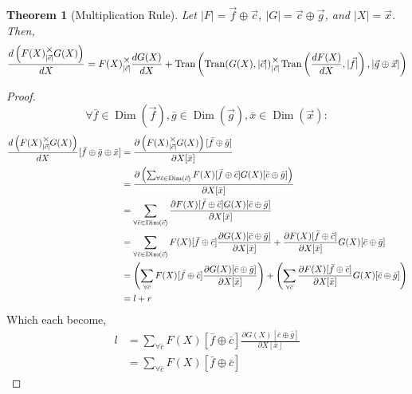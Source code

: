 \documentclass[12pt]{article}
\theoremstyle{definition}
\theoremstyle{plain}
\newtheorem{theorem}{Theorem}[section]
\theoremstyle{ppart}
\DeclareMathOperator{\Dim}{Dim}
\DeclareMathOperator{\Tran}{Tran}
\newcommand{\mmult}[1]{\text{\raisebox{1ex}{$\underset{#1}{\times}$}}}
\begin{document}
\begin{landscape}
\begin{theorem}[Multiplication Rule]
Let $|F| = \vec{f} \oplus \vec{c}$, $|G| = \vec{c} \oplus \vec{g}$,
and $|X| = \vec{x}$. Then,
\begin{align*}
 \frac{d\left(F(X) \mmult{|\vec{c}|} G(X)\right)}{dX} =
 F(X) \mmult{|\vec{c}|} \frac{dG(X)}{dX} +
 \Tran\left(
   \Tran(G(X), |\vec{c}|)
     \mmult{|\vec{c}|}
   \Tran\left(\frac{dF(X)}{dX}, |\vec{f}|\right),
   |\vec{g} \oplus \vec{x}|
 \right)
\end{align*}
\end{theorem}
\begin{proof}
\[
 \forall
  \bar{f} \in \Dim(\vec{f}),
  \bar{g} \in \Dim(\vec{g}),
  \bar{x} \in \Dim(\vec{x})
 :
\]
\begin{align*}
 \frac{d\left(F(X) \mmult{|\vec{c}|} G(X)\right)}{dX}
  [\bar{f} \oplus \bar{g} \oplus \bar{x}]
 &= \frac{
       \partial \left(F(X) \mmult{|\vec{c}|} G(X)\right)[\bar{f} \oplus \bar{g}]
    }{
       \partial X[\bar{x}]
    } \\
 &= \frac{
       \partial \left(
        \sum_{\forall \bar{c} \in \Dim(\vec{c})}
         F(X)[\bar{f} \oplus \bar{c}] G(X)[\bar{c} \oplus \bar{g}]
      \right)
    }{
       \partial X[\bar{x}]
    } \\
 &= \sum_{\forall \bar{c} \in \Dim(\vec{c})}
    \frac{
      \partial F(X)[\bar{f} \oplus \bar{c}] G(X)[\bar{c} \oplus \bar{g}]
    }{
      \partial X[\bar{x}]
    }\\
 &= \sum_{\forall \bar{c} \in \Dim(\vec{c})}
    F(X)[\bar{f} \oplus \bar{c}]
    \frac{\partial G(X)[\bar{c} \oplus \bar{g}]}{\partial X[\bar{x}]}
    +
    \frac{\partial F(X)[\bar{f} \oplus \bar{c}]}{\partial X[\bar{x}]}
    G(X)[\bar{c} \oplus \bar{g}] \\
 &=
   \left(
    \sum_{\forall \bar{c}}
      F(X)[\bar{f} \oplus \bar{c}]
      \frac{\partial G(X)[\bar{c} \oplus \bar{g}]}{\partial X[\bar{x}]}
   \right)
   +
   \left(
    \sum_{\forall \bar{c}}
      \frac{\partial F(X)[\bar{f} \oplus \bar{c}]}{\partial X[\bar{x}]}
      G(X)[\bar{c} \oplus \bar{g}]
   \right) \\
 &=
    l + r
\end{align*}
Which each become,
\begin{align*}
 l
 &=
  \sum_{\forall \bar{c}}
    F(X)[\bar{f} \oplus \bar{c}]
    \frac{\partial G(X)[\bar{c} \oplus \bar{g}]}{\partial X[\bar{x}]} \\
 &=
  \sum_{\forall \bar{c}}
    F(X)[\bar{f} \oplus \bar{c}]

\end{align*}
\end{proof}
\end{landscape}
\end{document}
